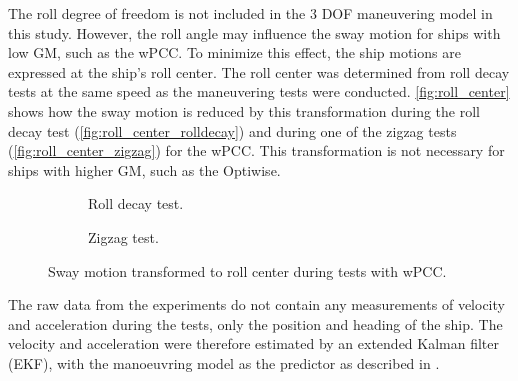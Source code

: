\noindent The roll degree of freedom is not included in the 3 DOF maneuvering model in this study. However, the roll angle may influence the sway motion for ships with low GM, such as the wPCC. To minimize this effect, the ship motions are expressed at the ship's roll center. The roll center was determined from roll decay tests at the same speed as the maneuvering tests were conducted. \autoref{fig:roll_center} shows how the sway motion is reduced by this transformation during the roll decay test (\autoref{fig:roll_center_rolldecay}) and during one of the zigzag tests (\autoref{fig:roll_center_zigzag}) for the wPCC. This transformation is not necessary for ships with higher GM, such as the Optiwise.
\begin{figure}[h]
     \centering
     \begin{subfigure}[b]{0.49\textwidth}
         \centering
         
        \caption{Roll decay test.}
        \label{fig:roll_center_rolldecay}
     \end{subfigure}
     \hfill
     \begin{subfigure}[b]{0.49\textwidth}
        \centering
        
        \caption{Zigzag test.}
        \label{fig:roll_center_zigzag}
     \end{subfigure}
        \caption{Sway motion transformed to roll center during tests with wPCC.}
        \label{fig:roll_center}
\end{figure}

The raw data from the experiments do not contain any measurements of velocity and acceleration during the tests, only the position and heading of the ship. The velocity and acceleration were therefore estimated by an extended Kalman filter (EKF), with the manoeuvring model as the predictor as described in \citet{alexanderssonSystemIdentificationVessel2022}.

